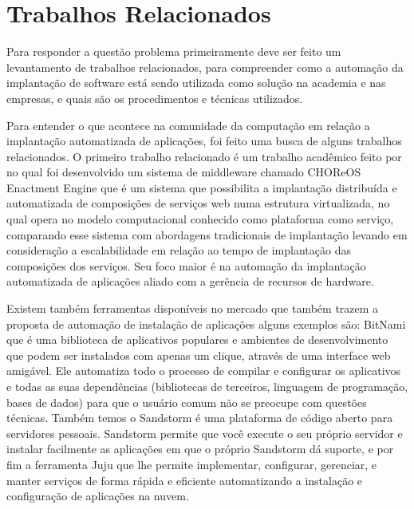 \section{Trabalhos Relacionados}
\label{section:trabalhos_relacionados}
Para responder a questão problema primeiramente deve ser feito um levantamento
de trabalhos relacionados, para compreender como a automação da implantação
de software está sendo utilizada como solução na academia e nas empresas, e
quais são os procedimentos e técnicas utilizados.

Para entender o que acontece na comunidade da computação em relação a implantação
automatizada de aplicações, foi feito uma busca de alguns trabalhos relacionados. O primeiro
trabalho relacionado é um trabalho acadêmico feito por \cite{leo2014} no qual foi
desenvolvido um sistema de middleware chamado CHOReOS Enactment Engine que é um
sistema que possibilita a implantação distribuída e automatizada de composições
de serviços web numa estrutura virtualizada, no qual opera no modelo
computacional conhecido como plataforma como serviço, comparando esse sistema
com abordagens tradicionais de implantação levando em consideração a escalabilidade
em relação ao tempo de implantação das composições dos serviços. Seu foco maior
é na automação da implantação automatizada de aplicações aliado com a gerência de recursos
de hardware.

Existem também ferramentas disponíveis no mercado que também trazem a proposta
de automação de instalação de aplicações alguns exemplos são: \cite{bitnami}
BitNami que é uma biblioteca de aplicativos populares e ambientes de
desenvolvimento que podem ser instalados com apenas um clique, através de uma interface web
amigável. Ele automatiza todo o
processo de compilar e configurar os aplicativos e todas as suas dependências
(bibliotecas de terceiros, linguagem de programação, bases de dados) para que o
usuário comum não se preocupe com questões técnicas. Também temos o \cite{sandstormio}
Sandstorm é uma plataforma de código aberto para servidores
pessoais. Sandstorm permite que você execute o seu próprio servidor e instalar
facilmente as aplicações em que o próprio Sandstorm dá suporte, e por fim a ferramenta \cite{juju}
Juju que lhe permite implementar, configurar, gerenciar, e manter serviços de forma
rápida e eficiente automatizando a instalação e configuração de aplicações na nuvem.


